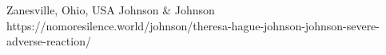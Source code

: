           {
            Zanesville, Ohio, USA
          }
          {
          }
          {
            Johnson \& Johnson
          }
          {
          }
          {
          }
          {
            https://nomoresilence.world/johnson/theresa-hague-johnson-johnson-severe-adverse-reaction/
          }

